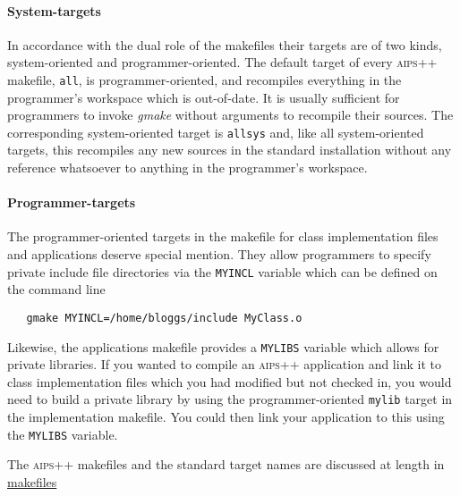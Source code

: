 \paragraph{System-targets}
In accordance with the dual role of the makefiles their targets are of two
kinds, system-oriented and programmer-oriented.  The default target of every
\textsc{aips++} makefile, \texttt{all}, is programmer-oriented, and recompiles
everything in the programmer's workspace which is out-of-date.  It is usually
sufficient for programmers to invoke \textit{gmake} without arguments to recompile
their sources.  The corresponding system-oriented target is \texttt{allsys} and,
like all system-oriented targets, this recompiles any new sources in the
standard installation without any reference whatsoever to anything in the
programmer's workspace.

\paragraph{Programmer-targets}
The programmer-oriented targets in the makefile for class implementation files
and applications deserve special mention.  They allow programmers to specify
private include file directories via the \texttt{MYINCL} variable which can be
defined on the command line

\begin{verbatim}
   gmake MYINCL=/home/bloggs/include MyClass.o
\end{verbatim}

\noindent
Likewise, the applications makefile provides a \texttt{MYLIBS} variable which
allows for private libraries.  If you wanted to compile an \textsc{aips++}
application and link it to class implementation files which you had modified
but not checked in, you would need to build a private library by using the
programmer-oriented \texttt{mylib} target in the implementation makefile.  You
could then link your application to this using the \texttt{MYLIBS} variable.

The \textsc{aips++} makefiles and the standard target names are discussed at
length in \hyperref{makefiles}{makefiles (see AIPS++ System Manual, Section }{ for more details)}{makefiles}































